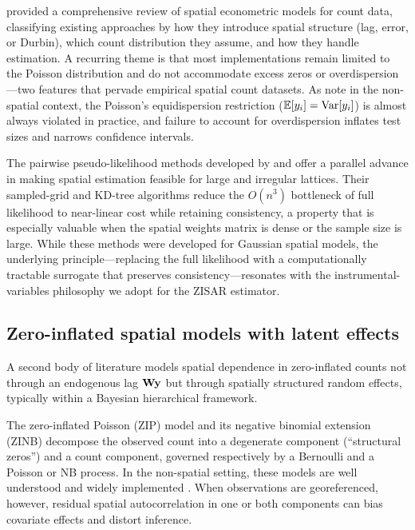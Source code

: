 \citet{glaser2017} provided a comprehensive review of spatial econometric models for count data, classifying existing approaches by how they introduce spatial structure (lag, error, or Durbin), which count distribution they assume, and how they handle estimation.
A recurring theme is that most implementations remain limited to the Poisson distribution and do not accommodate excess zeros or overdispersion---two features that pervade empirical spatial count datasets.
As \citet{cameron_trivedi2013} note in the non-spatial context, the Poisson's equidispersion restriction ($\mathbb{E}[y_i] = \mathrm{Var}[y_i]$) is almost always violated in practice, and failure to account for overdispersion inflates test sizes and narrows confidence intervals.

The pairwise pseudo-likelihood methods developed by \citet{arbia_nardelli_salvini} and \citet{arbia_nardelli2024} offer a parallel advance in making spatial estimation feasible for large and irregular lattices.
Their sampled-grid and KD-tree algorithms reduce the $O(n^3)$ bottleneck of full likelihood to near-linear cost while retaining consistency, a property that is especially valuable when the spatial weights matrix is dense or the sample size is large.
While these methods were developed for Gaussian spatial models, the underlying principle---replacing the full likelihood with a computationally tractable surrogate that preserves consistency---resonates with the instrumental-variables philosophy we adopt for the ZISAR estimator.

\subsection{Zero-inflated spatial models with latent effects}\label{sec:lit_zi_spatial}

A second body of literature models spatial dependence in zero-inflated counts not through an endogenous lag $\mathbf{W}\mathbf{y}$ but through spatially structured random effects, typically within a Bayesian hierarchical framework.

The zero-inflated Poisson (ZIP) model \citep{lambert1992} and its negative binomial extension (ZINB) \citep{cameron_trivedi2013,hilbe2011} decompose the observed count into a degenerate component (``structural zeros'') and a count component, governed respectively by a Bernoulli and a Poisson or NB process.
In the non-spatial setting, these models are well understood and widely implemented \citep[e.g.][]{zeileis2008,brooks2017}.
When observations are georeferenced, however, residual spatial autocorrelation in one or both components can bias covariate effects and distort inference.

